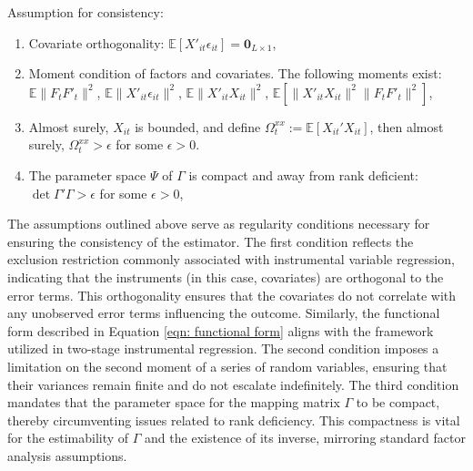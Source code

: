 \documentclass[12pt]{article}
\begin{document}
\begin{assumption}
    Assumption for consistency:
    \begin{enumerate}
        \item Covariate orthogonality: $\mathbb{E}\left[X'_{it} \epsilon_{it}\right] = \textbf{0}_{L\times 1}$,
        
        \item Moment condition of factors and covariates. The following moments exist: $\mathbb{E}\|F_{t}F'_{t}\|^2$, $\mathbb{E}\|X'_{it}\epsilon_{it}\|^2$, $\mathbb{E}\|X'_{it}X_{it}\|^2$, $\mathbb{E}\left[\|X'_{it}X_{it}\|^2\|F_{t}F'_{t}\|^2 \right]$, 
    
        \item Almost surely, $X_{it}$ is bounded, and define $\Omega_t^{xx} := \mathbb{E}\left[ X_{it}' X_{it} \right]$, then almost surely, $\Omega_t^{xx} > \epsilon$ for some $\epsilon > 0$.
        
        \item The parameter space $\Psi$ of $\Gamma$ is compact and away from rank deficient: $\det{\Gamma' \Gamma} > \epsilon$ for some $\epsilon>0$,
        
    \end{enumerate}
    \label{app: ass consistency}
\end{assumption}

The assumptions outlined above serve as regularity conditions necessary for ensuring the consistency of the estimator. The first condition reflects the exclusion restriction commonly associated with instrumental variable regression, indicating that the instruments (in this case, covariates) are orthogonal to the error terms. This orthogonality ensures that the covariates do not correlate with any unobserved error terms influencing the outcome. Similarly, the functional form described in Equation \ref{eqn: functional form} aligns with the framework utilized in two-stage instrumental regression. The second condition imposes a limitation on the second moment of a series of random variables, ensuring that their variances remain finite and do not escalate indefinitely. The third condition mandates that the parameter space for the mapping matrix $\Gamma$ to be compact, thereby circumventing issues related to rank deficiency. This compactness is vital for the estimability of $\Gamma$ and the existence of its inverse, mirroring standard factor analysis assumptions.
\end{document}
